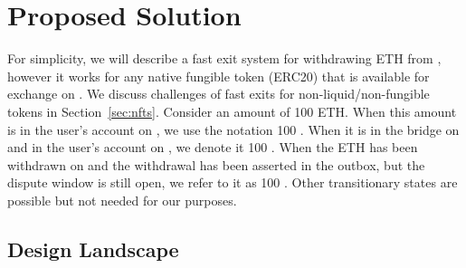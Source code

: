 %
%
%
%
%

\section{Proposed Solution} 

For simplicity, we will describe a fast exit system for withdrawing ETH from \layertwo, however it works for any \layerone native fungible token (\eg ERC20) that is available for exchange on \layerone. We discuss challenges of fast exits for non-liquid/non-fungible tokens in Section~\ref{sec:nfts}. Consider an amount of 100 ETH. When this amount is in the user's account on \layerone, we use the notation 100 \ethone. When it is in the bridge on \layerone and in the user's account on \layertwo, we denote it 100 \ethtwo. When the ETH has been withdrawn on \layertwo and the withdrawal has been asserted in the \layerone outbox, but the dispute window is still open, we refer to it as 100 \ethxx. Other transitionary states are possible but not needed for our purposes.

\subsection{Design Landscape}

